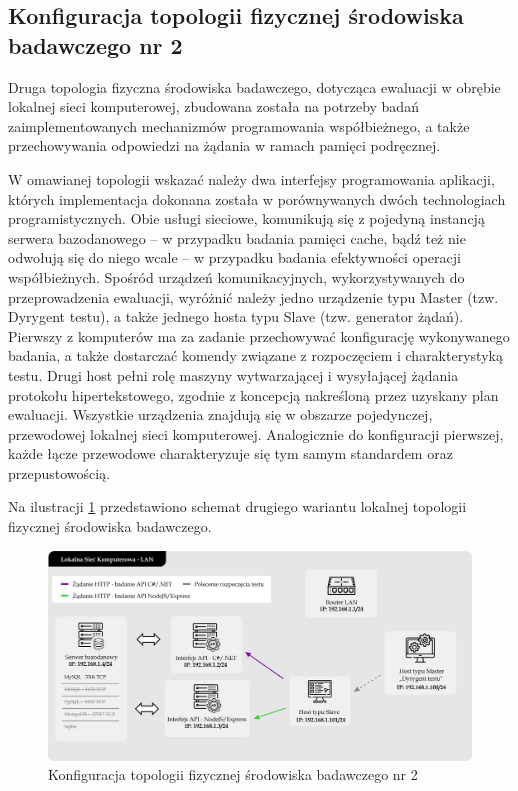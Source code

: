 \subsection*{Konfiguracja topologii fizycznej środowiska badawczego nr 2}
\label{sec:lokalne-srodowisko-badawcze-ver-2}
Druga topologia fizyczna środowiska badawczego, dotycząca ewaluacji w obrębie lokalnej sieci komputerowej, zbudowana została na potrzeby badań zaimplementowanych mechanizmów programowania współbieżnego, a także przechowywania odpowiedzi na żądania w ramach pamięci podręcznej.

W omawianej topologii wskazać należy dwa interfejsy programowania aplikacji, których implementacja dokonana została w porównywanych dwóch technologiach programistycznych. Obie usługi sieciowe, komunikują się z pojedyną instancją serwera bazodanowego -- w przypadku badania pamięci cache, bądź też nie odwołują się do niego wcale -- w przypadku badania efektywności operacji współbieżnych. Spośród urządzeń komunikacyjnych, wykorzystywanych do przeprowadzenia ewaluacji, wyróżnić należy jedno urządzenie typu Master (tzw. Dyrygent testu), a także jednego hosta typu Slave (tzw. generator żądań). Pierwszy z komputerów ma za zadanie przechowywać konfigurację wykonywanego badania, a także dostarczać komendy związane z rozpoczęciem i charakterystyką testu. Drugi host pełni rolę maszyny wytwarzającej i wysyłającej żądania protokołu hipertekstowego, zgodnie z koncepcją nakreśloną przez uzyskany plan ewaluacji. Wszystkie urządzenia znajdują się w obszarze pojedynczej, przewodowej lokalnej sieci komputerowej. Analogicznie do konfiguracji pierwszej, każde łącze przewodowe charakteryzuje się tym samym standardem oraz przepustowością.

Na ilustracji \ref{fig:topologia-2} przedstawiono schemat drugiego wariantu lokalnej topologii fizycznej środowiska badawczego.

\begin{figure}[ht]
    \centering
     \includegraphics[width=\linewidth]{rys04/topologia-2.png}
    \caption{Konfiguracja topologii fizycznej środowiska badawczego nr 2}
    \label{fig:topologia-2}
\end{figure}

